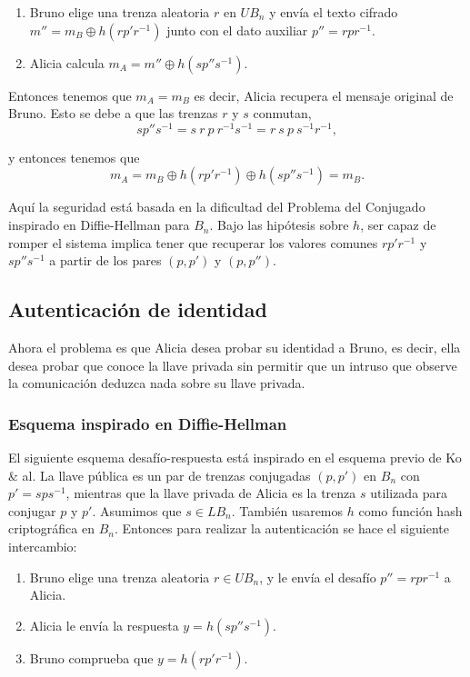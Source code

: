 \documentclass[12pt]{book}
\theoremstyle{definition}
\begin{document}
\begin{enumerate}
\item Bruno elige una trenza aleatoria $r$ en $UB_n$ y envía el texto cifrado $m''=m_B\oplus h(rp'r^{-1})$ junto con el dato auxiliar $p''=rpr^{-1}$.
\item Alicia calcula $m_A = m''\oplus h(sp''s^{-1})$. 

\end{enumerate}

Entonces tenemos que $m_A = m_B$ es decir, Alicia recupera el mensaje original de Bruno. Esto se debe a que las trenzas $r$ y $s$ conmutan,
$$sp''s^{-1}=s\ r\ p\ r^{-1}s^{-1}=r\ s\ p\ s^{-1}r^{-1},$$

y entonces tenemos que 
$$m_A = m_B\oplus h(rp'r^{-1})\oplus h(sp''s^{-1})=m_B.$$

Aquí la seguridad está basada en la dificultad del Problema del Conjugado inspirado en Diffie-Hellman para $B_n$. Bajo las hipótesis sobre $h$, ser capaz de romper el sistema implica tener que recuperar los valores comunes $rp'r^{-1}$ y $sp''s^{-1}$ a partir de los pares $(p,p')$ y $(p,p'')$.

\subsection{Autenticación de identidad}
Ahora el problema es que Alicia desea probar su identidad a Bruno, es decir, ella desea probar que conoce la llave privada sin permitir que un intruso que observe la comunicación deduzca nada sobre su llave privada.

\subsubsection*{Esquema inspirado en Diffie-Hellman}

El siguiente esquema desafío-respuesta \cite{Sibert} está inspirado en el esquema previo de Ko \& al. La llave pública es un par de trenzas conjugadas $(p,p')$ en $B_n$ con $p'=sps^{-1}$, mientras que la llave privada de Alicia es la trenza $s$ utilizada para conjugar $p$ y $p'$. Asumimos que $s\in LB_n$. También usaremos $h$ como función hash criptográfica en $B_n$. Entonces para realizar la autenticación se hace el siguiente intercambio:

\begin{enumerate}
\item Bruno elige una trenza aleatoria $r\in UB_n$, y le envía el desafío $p''=rpr^{-1}$ a Alicia.
\item Alicia le envía la respuesta $y = h(sp''s^{-1})$.
\item Bruno comprueba que $y=h(rp'r^{-1})$.
\end{enumerate}
\end{document}
